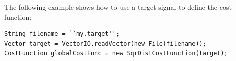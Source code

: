 \documentclass[11pt]{article} %
\begin{document}
The following example shows how to use a target signal to define the cost function:
\begin{verbatim}
String filename = ``my.target'';
Vector target = VectorIO.readVector(new File(filename));
CostFunction globalCostFunc = new SqrDistCostFunction(target);
\end{verbatim}



\end{document}
